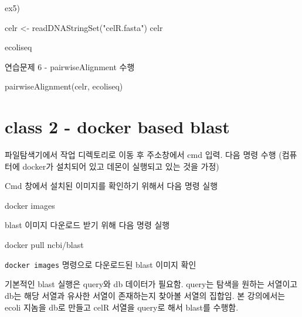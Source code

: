 \documentclass[
]{book}
\newenvironment{Shaded}{\begin{snugshade}}{\end{snugshade}}
\newcommand{\ExtensionTok}[1]{#1}
\newcommand{\FunctionTok}[1]{\textcolor[rgb]{0.00,0.00,0.00}{#1}}
\newcommand{\NormalTok}[1]{#1}
\newcommand{\OtherTok}[1]{\textcolor[rgb]{0.56,0.35,0.01}{#1}}
\newcommand{\StringTok}[1]{\textcolor[rgb]{0.31,0.60,0.02}{#1}}
\begin{document}
ex5)

\begin{Shaded}
\begin{Highlighting}[]
\NormalTok{celr }\OtherTok{\textless{}{-}} \FunctionTok{readDNAStringSet}\NormalTok{(}\StringTok{"celR.fasta"}\NormalTok{)}
\NormalTok{celr}

\NormalTok{ecoliseq}
\end{Highlighting}
\end{Shaded}

연습문제 6 - pairwiseAlignment 수행

\begin{Shaded}
\begin{Highlighting}[]
\FunctionTok{pairwiseAlignment}\NormalTok{(celr, ecoliseq)}
\end{Highlighting}
\end{Shaded}

\hypertarget{class-2---docker-based-blast}{%
\section{class 2 - docker based blast}\label{class-2---docker-based-blast}}

파일탐색기에서 작업 디렉토리로 이동 후 주소창에서 cmd 입력. 다음 명령 수행 (컴퓨터에 docker가 설치되어 있고 데몬이 실행되고 있는 것을 가정)

Cmd 창에서 설치된 이미지를 확인하기 위해서 다음 명령 실행

\begin{Shaded}
\begin{Highlighting}[]
\ExtensionTok{docker}\NormalTok{ images}
\end{Highlighting}
\end{Shaded}

blast 이미지 다운로드 받기 위해 다음 명령 실행

\begin{Shaded}
\begin{Highlighting}[]
\ExtensionTok{docker}\NormalTok{ pull ncbi/blast}
\end{Highlighting}
\end{Shaded}

\texttt{docker\ images} 명령으로 다운로드된 blast 이미지 확인

기본적인 blast 실행은 query와 db 데이터가 필요함. query는 탐색을 원하는 서열이고 db는 해당 서열과 유사한 서열이 존재하는지 찾아볼 서열의 집합임. 본 강의에서는 ecoli 지놈을 db로 만들고 celR 서열을 query로 해서 blast를 수행함.
\end{document}
